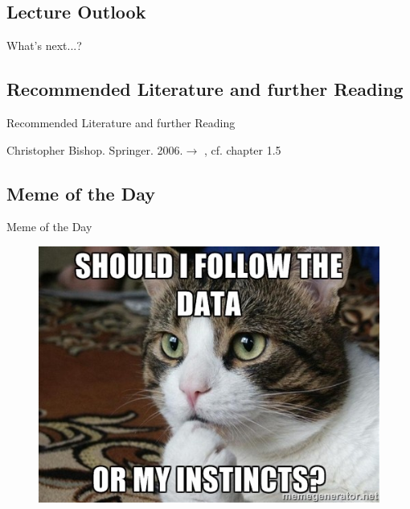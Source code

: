 \subsection{Lecture Outlook}

\begin{frame}{What's next...?}{}
\end{frame}


\subsection{Recommended Literature and further Reading}

\begin{frame}[allowframebreaks]{Recommended Literature and further Reading}{}
	\footnotesize
	\begin{thebibliography}{2}
			{Christopher Bishop. Springer. 2006.}{$\rightarrow$ \href{
				http://users.isr.ist.utl.pt/~wurmd/Livros/school/Bishop\%20-\%20Pattern\%20Recognition\%20And\%20Machine\%20Learning\%20-\%20Springer\%20\%202006.pdf
			}{}, cf. chapter 1.5}
	\end{thebibliography}
\end{frame}


\subsection{Meme of the Day}

\begin{frame}{Meme of the Day}{}
	\begin{figure}
		\includegraphics[scale=0.35]{03_decision_theory/02_img/meme_of_the_day}
	\end{figure}
\end{frame}


\makethanks

